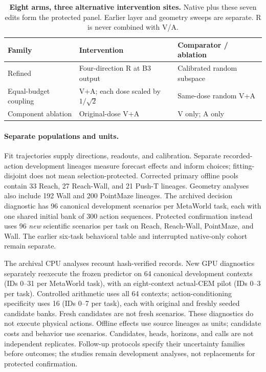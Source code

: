\documentclass{article}
\begin{document}
\begin{table}[t]
\centering\small
\caption{\textbf{Eight arms, three alternative intervention sites.} Native plus these seven edits form the protected panel. Earlier layer and geometry sweeps are separate. R is never combined with V/A.}
\label{fig:arms}
\begin{tabular}{@{}lp{}p{}@{}}
\toprule
Family & Intervention & Comparator / ablation\\
\midrule
Refined & Four-direction R at B3 output & Calibrated random subspace\\
Equal-budget coupling & V+A; each dose scaled by $1/\sqrt{2}$ & Same-dose random V+A\\
Component ablation & Original-dose V+A & V only; A only\\
\bottomrule
\end{tabular}
\end{table}

\paragraph{Separate populations and units.}
Fit trajectories supply directions, readouts, and calibration. Separate recorded-action development lineages measure forecast effects and inform choices; fitting-disjoint does not mean selection-protected. Corrected primary offline pools contain 33 Reach, 27 Reach-Wall, and 21 Push-T lineages. Geometry analyses also include 192 Wall and 200 PointMaze lineages. The archived decision diagnostic has 96 canonical development scenarios per MetaWorld task, each with one shared initial bank of 300 action sequences. Protected confirmation instead uses 96 \emph{new} scientific scenarios per task on Reach, Reach-Wall, PointMaze, and Wall. The earlier six-task behavioral table and interrupted native-only cohort remain separate.

The archival CPU analyses recount hash-verified records. New GPU diagnostics separately reexecute the frozen predictor on 64 canonical development contexts (IDs 0--31 per MetaWorld task), with an eight-context actual-CEM pilot (IDs 0--3 per task). Controlled arithmetic uses all 64 contexts; action-conditioning specificity uses 16 (IDs 0--7 per task), each with original and freshly seeded candidate banks. Fresh candidates are not fresh scenarios. These diagnostics do not execute physical actions. Offline effects use source lineages as units; candidate costs and behavior use scenarios. Candidates, heads, horizons, and calls are not independent replicates. Follow-up protocols specify their uncertainty families before outcomes; the studies remain development analyses, not replacements for protected confirmation.
\end{document}
